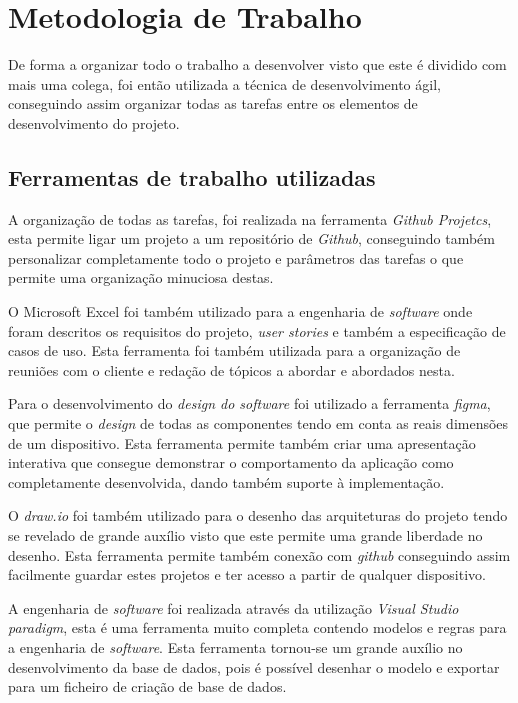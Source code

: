
\chapter{Metodologia de Trabalho}
De forma a organizar todo o trabalho a desenvolver visto que este é dividido com mais uma colega, 
foi então utilizada a técnica de desenvolvimento ágil, conseguindo assim organizar todas as tarefas 
entre os elementos de desenvolvimento do projeto.

\section{Ferramentas de trabalho utilizadas}

A organização de todas as tarefas, foi realizada na ferramenta \textit{Github Projetcs}, esta 
permite ligar um projeto a um repositório de \textit{Github}, conseguindo também personalizar completamente todo 
o projeto e parâmetros das tarefas o que permite uma organização minuciosa destas.

O Microsoft Excel foi também utilizado para a engenharia de \textit{software} onde foram descritos os requisitos 
do projeto, \textit{user stories} e também a especificação de casos de uso. Esta ferramenta foi também utilizada 
para a organização de reuniões com o cliente e redação de tópicos a abordar e abordados nesta.

Para o desenvolvimento do \textit{design do software} foi utilizado a ferramenta \textit{figma}, que permite o \textit{design} de 
todas as componentes tendo em conta as reais dimensões de um dispositivo. Esta ferramenta 
permite também criar uma apresentação interativa que consegue demonstrar o comportamento da aplicação 
como completamente desenvolvida, dando também suporte à implementação.

O \textit{draw.io} foi também utilizado para o desenho das arquiteturas do projeto tendo se revelado de grande auxílio 
visto que este permite uma grande liberdade no desenho. Esta ferramenta permite também 
conexão com \textit{github} conseguindo assim facilmente guardar estes projetos e ter acesso a partir de qualquer 
dispositivo.

A engenharia de \textit{software} foi realizada através da utilização \textit{Visual Studio paradigm}, esta é uma ferramenta muito 
completa contendo modelos e regras para a engenharia de \textit{software}. Esta ferramenta tornou-se um grande 
auxílio no desenvolvimento da base de dados, pois é possível desenhar o modelo e exportar para um ficheiro 
de criação de base de dados.

